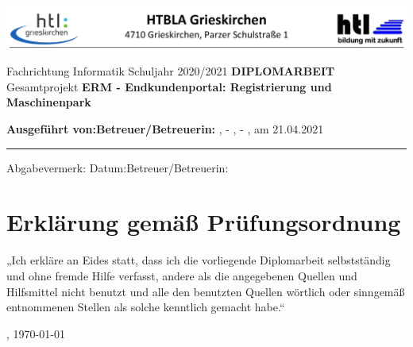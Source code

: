 \newcommand{\IncludeSchoolTemplate}[2]{
	\vspace*{-7em}
	\makebox[\textwidth]{
		\begin{tikzpicture}[
			every node/.style={anchor=north west,inner sep=0pt},
			x=1mm, y=1mm]
			\node (templatepage) at (0,0)
			{\texttt{[image: ./summary.pdf]}};
			#2
		\end{tikzpicture}
	}
	\newpage
}


\includegraphics[width=\textwidth]{./grafiken/school-header.png}
{\centering
	\vskip1cm
	Fachrichtung Informatik
	\vskip2cm
	Schuljahr 2020/2021
	\vskip4cm
	\Huge\textbf{DIPLOMARBEIT}
	\vskip10pt
	\large
	Gesamtprojekt
	\vskip5pt
	\Huge\textbf{ERM - Endkundenportal: Registrierung und Maschinenpark}
	\small
	\vskip4cm
	\begin{flushleft}
		\textbf{Ausgeführt von:}\tabto{9.8cm}\textbf{Betreuer/Betreuerin:}\linebreak
		\ThRealAuthorNameOne, \ThAuthorsClass-\ThAuthorOneNumber\tabto{9.8cm}\ThSupervisorName\linebreak
		\ThRealAuthorNameTwo, \ThAuthorsClass-\ThAuthorTwoNumber
		\vskip0.5cm
		\ThPhysicalLocation, am 21.04.2021
		\hrule
		Abgabevermerk:\linebreak
		Datum:\tabto{9.8cm}Betreuer/Betreuerin:
	\end{flushleft}
}



\chapter*{\hspace{5pt}Erklärung gemäß Prüfungsordnung}
\thispagestyle{empty}
„Ich erkläre an Eides statt, dass ich die vorliegende Diplomarbeit selbstständig und ohne fremde Hilfe verfasst, andere als die angegebenen Quellen und Hilfsmittel nicht benutzt und alle den benutzten Quellen wörtlich oder sinngemäß entnommenen Stellen als solche kenntlich gemacht habe.“

\ThPhysicalLocation, \today{}

